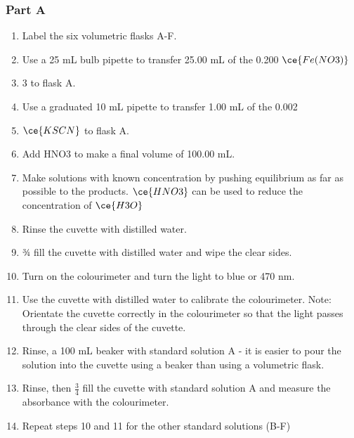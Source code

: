 	\subsubsection{Part A}
		\begin{enumerate}
			\item Label the six volumetric flasks A-F.
			\item Use a 25 mL bulb pipette to transfer 25.00 mL of the 0.200 \unit{\moLar} $\ce{Fe(NO3)}$\item 3 to flask A.
			\item Use a graduated 10 mL pipette to transfer 1.00 mL of the 0.002 \unit{\moLar} \item $\ce{KSCN}$ to flask A.
			\item Add HNO3 to make a final volume of 100.00 mL.
			\item Make solutions with known concentration by pushing equilibrium as far as possible to the products. $\ce{HNO3}$ can be used to reduce the concentration of $\ce{H3O}$
			\item Rinse the cuvette with distilled water.
			\item ¾ fill the cuvette with distilled water and wipe the clear sides. 
			\item Turn on the colourimeter and turn the light to blue or 470 nm.
			\item Use the cuvette with distilled water to calibrate the colourimeter. Note: Orientate the cuvette correctly in the colourimeter so that the light passes through the clear sides of the cuvette.
			\item Rinse, a 100 mL beaker with standard solution A - it is easier to pour the solution into the cuvette using a beaker than using a volumetric flask.
			\item Rinse, then $\frac{3}{4}$ fill the cuvette with standard solution A and measure the absorbance with the colourimeter.
			\item Repeat steps 10 and 11 for the other standard solutions (B-F)
		\end{enumerate}